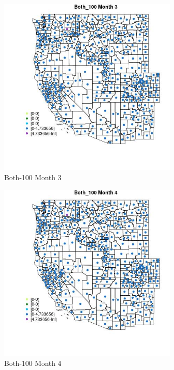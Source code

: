 \begin{figure} 
\centering  
\includegraphics[width=0.77\textwidth]{Code_Outputs/df_report_ML_predictors_CountyCentroid_Locations_Dates_2008-01-01to2018-12-31_MapObsMo3Both_100.jpg} 
\caption{\label{fig:df_report_ML_predictors_CountyCentroid_Locations_Dates_2008-01-01to2018-12-31MapObsMo3Both_100}Both-100 Month 3} 
\end{figure} 
 

\begin{figure} 
\centering  
\includegraphics[width=0.77\textwidth]{Code_Outputs/df_report_ML_predictors_CountyCentroid_Locations_Dates_2008-01-01to2018-12-31_MapObsMo4Both_100.jpg} 
\caption{\label{fig:df_report_ML_predictors_CountyCentroid_Locations_Dates_2008-01-01to2018-12-31MapObsMo4Both_100}Both-100 Month 4} 
\end{figure} 
 

